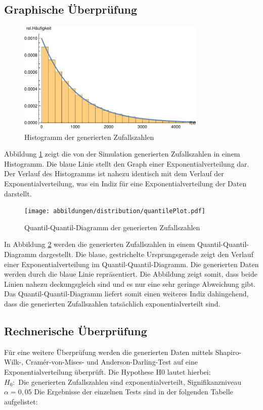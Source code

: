 \subsection{Graphische Überprüfung}

\begin{figure}[htpb]
	\centering
	\includegraphics[width=0.8\textwidth]{abbildungen/distribution/histogrammExpVerteilung.pdf}
	\caption{Histogramm der generierten Zufallszahlen}
	\label{fig:HistogrammExp}
\end{figure}

Abbildung \ref{fig:HistogrammExp} zeigt die von der Simulation generierten Zufallszahlen in einem Histogramm. Die blaue Linie stellt den Graph einer Exponentialverteilung dar. Der Verlauf des Histogramms ist nahezu identisch mit dem Verlauf der Exponentialverteilung, was ein Indiz für eine Exponentialverteilung der Daten darstellt.

\begin{figure}[htpb]
	\centering
	\texttt{[image: abbildungen/distribution/quantilePlot.pdf]}
	\caption{Quantil-Quantil-Diagramm der generierten Zufallszahlen}
	\label{fig:QQPlot}
\end{figure}

In Abbildung \ref{fig:QQPlot} werden die generierten Zufallszahlen in einem Quantil-Quantil-Diagramm dargestellt. Die blaue, gestrichelte Ursprungsgerade zeigt den Verlauf einer Exponentialverteilung im Quantil-Quantil-Diagramm. Die generierten Daten werden durch die blaue Linie repräsentiert. Die Abbildung zeigt somit, dass beide Linien nahezu deckungsgleich sind und es nur eine sehr geringe Abweichung gibt. Das Quantil-Quantil-Diagramm liefert somit einen weiteres Indiz dahingehend, dass die generierten Zufallszahlen tatsächlich exponentialverteilt sind.

\subsection{Rechnerische Überprüfung}
Für eine weitere Überprüfung werden die generierten Daten mittels Shapiro-Wilk-, Cramér-von-Mises- und Anderson-Darling-Test auf eine Exponentialverteilung überprüft. Die Hypothese H0 lautet hierbei: \\
$H_0:$ Die generierten Zufallszahlen sind exponentialverteilt, Signifikanzniveau $\alpha =0,05$ Die Ergebnisse der einzelnen Tests sind in der folgenden Tabelle aufgelistet:


